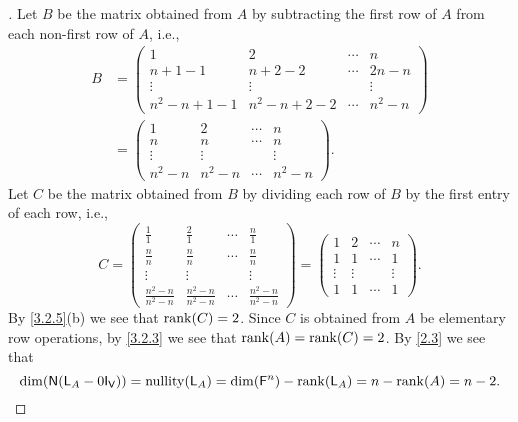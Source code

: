 \begin{proof}[]
	Let \(B\) be the matrix obtained from \(A\) by subtracting the first row of \(A\) from each non-first row of \(A\), i.e.,
	\begin{align*}
		B & = \begin{pmatrix}
			      1               & 2               & \cdots & n       \\
			      n + 1 - 1       & n + 2 - 2       & \cdots & 2n - n  \\
			      \vdots          & \vdots          &        & \vdots  \\
			      n^2 - n + 1 - 1 & n^2 - n + 2 - 2 & \cdots & n^2 - n
		      \end{pmatrix} \\
		  & = \begin{pmatrix}
			      1       & 2       & \cdots & n       \\
			      n       & n       & \cdots & n       \\
			      \vdots  & \vdots  &        & \vdots  \\
			      n^2 - n & n^2 - n & \cdots & n^2 - n
		      \end{pmatrix}.
	\end{align*}
	Let \(C\) be the matrix obtained from \(B\) by dividing each row of \(B\) by the first entry of each row, i.e.,
	\[
		C = \begin{pmatrix}
			\frac{1}{1}             & \frac{2}{1}             & \cdots & \frac{n}{1}             \\
			\frac{n}{n}             & \frac{n}{n}             & \cdots & \frac{n}{n}             \\
			\vdots                  & \vdots                  &        & \vdots                  \\
			\frac{n^2 - n}{n^2 - n} & \frac{n^2 - n}{n^2 - n} & \cdots & \frac{n^2 - n}{n^2 - n}
		\end{pmatrix} = \begin{pmatrix}
			1      & 2      & \cdots & n      \\
			1      & 1      & \cdots & 1      \\
			\vdots & \vdots &        & \vdots \\
			1      & 1      & \cdots & 1
		\end{pmatrix}.
	\]
	By \cref{3.2.5}(b) we see that \(\rk{C} = 2\).
	Since \(C\) is obtained from \(A\) be elementary row operations, by \cref{3.2.3} we see that \(\rk{A} = \rk{C} = 2\).
	By \cref{2.3} we see that
	\[
		\dim(\ns{\L_A - 0 \IT[\V]}) = \nt{\L_A} = \dim(\vs{F}^n) - \rk{\L_A} = n - \rk{A} = n - 2.
\]
\end{proof}

